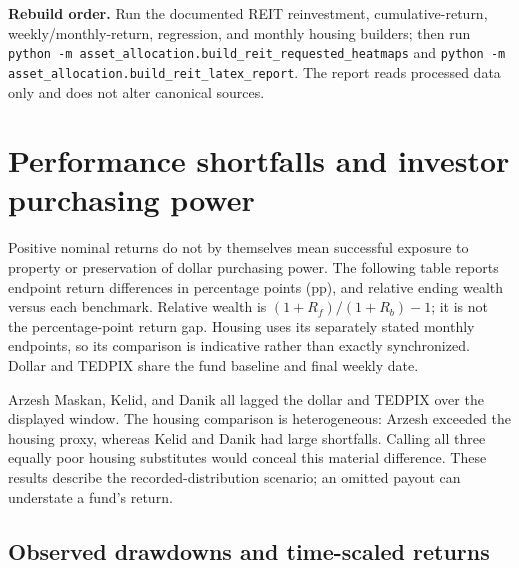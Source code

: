 \documentclass[11pt,a4paper]{article}
\begin{document}
\textbf{Rebuild order.} Run the documented REIT reinvestment, cumulative-return, weekly/monthly-return, regression, and monthly housing builders; then run \texttt{python -m asset\_allocation.build\_reit\_requested\_heatmaps} and \texttt{python -m asset\_allocation.build\_reit\_latex\_report}. The report reads processed data only and does not alter canonical sources.

\section{Performance shortfalls and investor purchasing power}

Positive nominal returns do not by themselves mean successful exposure to property or preservation of dollar purchasing power. The following table reports endpoint return differences in percentage points (pp), and relative ending wealth versus each benchmark. Relative wealth is $(1+R_f)/(1+R_b)-1$; it is not the percentage-point return gap. Housing uses its separately stated monthly endpoints, so its comparison is indicative rather than exactly synchronized. Dollar and TEDPIX share the fund baseline and final weekly date.

\begin{center}
\small
{}
\end{center}

Arzesh Maskan, Kelid, and Danik all lagged the dollar and TEDPIX over the displayed window. The housing comparison is heterogeneous: Arzesh exceeded the housing proxy, whereas Kelid and Danik had large shortfalls. Calling all three equally poor housing substitutes would conceal this material difference. These results describe the recorded-distribution scenario; an omitted payout can understate a fund's return.

\subsection{Observed drawdowns and time-scaled returns}
\end{document}
